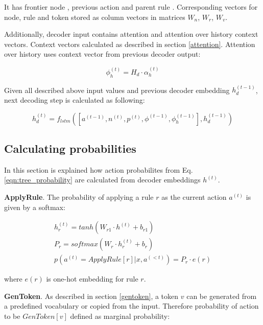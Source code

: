 It has frontier node , previous action  and parent rule . Corresponding vectors for node, rule and token stored as column vectors in matrices $W_n$, $W_r$, $W_v$.

Additionally, decoder input contains attention and attention over history context vectors. Context vectors calculated as described in section \ref{attention}. Attention over history uses context vector from previous decoder output:

\begin{equation}
    \phi_h^{(t)} = H_d\cdot\alpha_h^{(t)}
\end{equation}

Given all described above input values and previous decoder embedding $h_d^{(t-1)}$, next decoding step is calculated as following:

\begin{equation}
    h_d^{(t)}=f_{lstm}([a^{(t-1)}, n^{(t)}, p^{(t)}, \phi^{(t-1)}, \phi_h^{(t-1)}], h_d^{(t-1)})
\end{equation}

\subsection{Calculating probabilities}
In this section is explained how action probabilites from Eq. \ref{eqn:tree_probability} are calculated from decoder embeddings $h^{(t)}$.

\textbf{ApplyRule}. The probability of applying a rule $r$ as the current action $a^{(t)}$ is given by a softmax:

\begin{equation}
\begin{gathered}
    h^{(t)}_r = tanh(W _{r1}\cdot h^{(t)} + b_{r1}) \\
    P_r = softmax(W_r\cdot h^{(t)}_r  + b_r) \\
    p(a^{(t)} = ApplyRule[r]|x,a^{(<t)}) = P_r\cdot e(r)
\end{gathered}
\label{eqn:apply_rule}
\end{equation}

where $e(r)$ is one-hot embedding for rule $r$.

\textbf{GenToken}. As described in section \ref{gentoken}, a token $v$ can be generated from a predefined vocabulary or copied from the input. Therefore probability of action to be $GenToken[v]$ defined as marginal probability:
    
